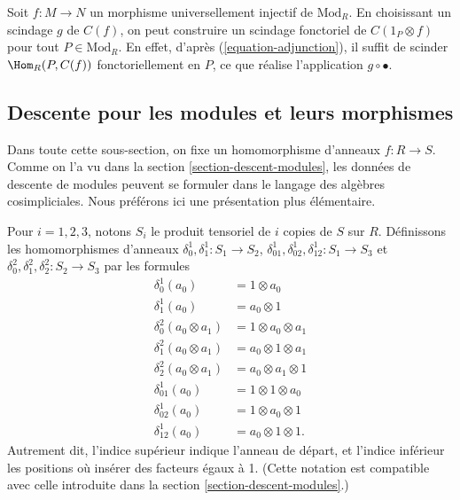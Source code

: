 \begin{remark}
\label{remark-functorial-splitting}
Soit $f: M \to N$ un morphisme universellement injectif de $\text{Mod}_R$.
En choisissant un scindage $g$ de $C(f)$, on peut construire
un scindage fonctoriel de $C(1_P \otimes f)$ pour tout $P \in \text{Mod}_R$.
En effet, d'après (\ref{equation-adjunction}), il suffit de scinder
$\Hom_R(P, 
C(f))$ fonctoriellement en $P$,
ce que réalise l'application $g \circ \bullet$.
\end{remark}


\subsection{Descente pour les modules et leurs morphismes}
\label{subsection-descent-modules-morphisms}

\noindent
Dans toute cette sous-section, on fixe un homomorphisme d'anneaux $f: R \to S$.
Comme on l'a vu dans la section \ref{section-descent-modules},
les données de descente de modules peuvent se formuler dans le langage
des algèbres cosimpliciales. Nous préférons ici une présentation plus élémentaire.

\medskip\noindent
Pour $i = 1, 2, 3$, notons $S_i$ le produit tensoriel de $i$ copies
de $S$ sur $R$.
Définissons les homomorphismes d'anneaux $\delta_0^1, \delta_1^1: S_1 \to S_2$,
$\delta_{01}^1, \delta_{02}^1, \delta_{12}^1: S_1 \to S_3$ et
$\delta_0^2, \delta_1^2, \delta_2^2: S_2 \to S_3$ par les formules
\begin{align*}
\delta^1_0  (a_0) & =  1 \otimes a_0 \\
\delta^1_1  (a_0) & = a_0 \otimes 1 \\
\delta^2_0  (a_0 \otimes a_1) & =  1 \otimes a_0 \otimes a_1 \\
\delta^2_1  (a_0 \otimes a_1) & =  a_0 \otimes 1 \otimes a_1 \\
\delta^2_2  (a_0 \otimes a_1) & =  a_0 \otimes a_1 \otimes 1 \\
\delta_{01}^1(a_0) & = 1 \otimes 1 \otimes a_0 \\
\delta_{02}^1(a_0) & = 1 \otimes a_0 \otimes 1 \\
\delta_{12}^1(a_0) & = a_0 \otimes 1 \otimes 1.
\end{align*}
Autrement dit, l'indice supérieur indique l'anneau de départ,
et l'indice inférieur les positions où insérer des facteurs égaux à 1.
(Cette notation est compatible avec celle introduite dans la
section \ref{section-descent-modules}.)


